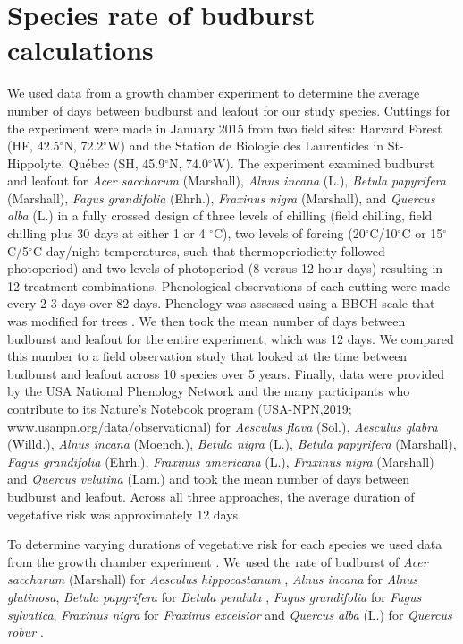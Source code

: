 \documentclass{article}\usepackage[]{graphicx}\usepackage[]{color}
\begin{document}
\section*{Species rate of budburst calculations}
We used data from a growth chamber experiment \citep{Flynn2018} to determine the average number of days between budburst and leafout for our study species. Cuttings for the experiment were made in January 2015 from two field sites: Harvard Forest (HF, 42.5$^{\circ}$N, 72.2$^{\circ}$W) and the Station de Biologie des Laurentides in St-Hippolyte, Qu\'ebec (SH, 45.9$^{\circ}$N, 74.0$^{\circ}$W). The experiment examined budburst and leafout for \textit{Acer saccharum} (Marshall), \textit{Alnus incana} (L.), \textit{Betula papyrifera} (Marshall), \textit{Fagus grandifolia} (Ehrh.), \textit{Fraxinus nigra} (Marshall), and \textit{Quercus alba} (L.) in a fully crossed design of three levels of chilling (field chilling, field chilling plus 30 days at either 1 or 4 $^{\circ}$C), two levels of forcing (20$^{\circ}$C/10$^{\circ}$C or 15$^{\circ}$C/5$^{\circ}$C day/night temperatures, such that thermoperiodicity followed photoperiod) and two levels of photoperiod (8 versus 12 hour days) resulting in 12 treatment combinations. Phenological observations of each cutting were made every 2-3 days over 82 days. Phenology was assessed using a BBCH scale that was modified for trees \citep{Finn2007}. We then took the mean number of days between budburst and leafout for the entire experiment, which was 12 days. We compared this number to a field observation study \citep{Donnelly2017} that looked at the time between budburst and leafout across 10 species over 5 years. Finally, data were provided by the USA National Phenology Network and the many participants who contribute to its Nature’s Notebook program (USA-NPN,2019; www.usanpn.org/data/observational) for \textit{Aesculus flava} (Sol.), \textit{Aesculus glabra} (Willd.), \textit{Alnus incana} (Moench.), \textit{Betula nigra} (L.), \textit{Betula papyrifera} (Marshall), \textit{Fagus grandifolia} (Ehrh.), \textit{Fraxinus americana} (L.), \textit{Fraxinus nigra} (Marshall) and \textit{Quercus velutina} (Lam.) and took the mean number of days between budburst and leafout. Across all three approaches, the average duration of vegetative risk was approximately 12 days.  

To determine varying durations of vegetative risk for each species we used data from the growth chamber experiment \citep{Flynn2018}. We used the rate of budburst of \textit{Acer saccharum} (Marshall) for \textit{Aesculus hippocastanum} \citep{Buerki2010}, \textit{Alnus incana} for \textit{Alnus glutinosa}, \textit{Betula papyrifera} for \textit{Betula pendula} \citep{Wang2016}, \textit{Fagus grandifolia} for \textit{Fagus sylvatica}, \textit{Fraxinus nigra} for \textit{Fraxinus excelsior} and \textit{Quercus alba} (L.) for \textit{Quercus robur} \citep{Hipp2017}.
\end{document}
